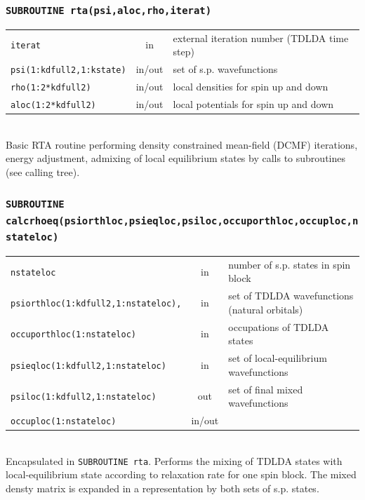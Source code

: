\documentclass[final,1p]{elsarticle}
\begin{document}
\subsubsection*{\tt SUBROUTINE rta(psi,aloc,rho,iterat)}
\begin{tabular}{lcl}
 {\tt iterat} & in & external iteration number (TDLDA time step)\\
 {\tt psi(1:kdfull2,1:kstate)} & in/out& set of s.p. wavefunctions\\
 {\tt rho(1:2*kdfull2)}& in/out & local densities for spin up and down\\
 {\tt aloc(1:2*kdfull2)} & in/out& local potentials for spin up and down\\
\end{tabular}
\\[4pt]
Basic RTA routine performing density constrained mean-field (DCMF)
iterations, energy adjustment, admixing of local equilibrium states by
calls to subroutines (see calling tree).



\subsubsection*{\tt SUBROUTINE calcrhoeq(psiorthloc,psieqloc,psiloc,occuporthloc,occuploc,nstateloc)}
\begin{tabular}{lcl}
 {\tt nstateloc} & in & number of s.p. states in spin block\\
 {\tt psiorthloc(1:kdfull2,1:nstateloc),} & in & set of TDLDA
 wavefunctions (natural orbitals)\\
 {\tt occuporthloc(1:nstateloc)} & in & occupations of TDLDA states\\
 {\tt psieqloc(1:kdfull2,1:nstateloc)} & in& set of local-equilibrium wavefunctions\\
 {\tt psiloc(1:kdfull2,1:nstateloc)} & out& set of final mixed wavefunctions\\
 {\tt occuploc(1:nstateloc)} & in/out & \\
\end{tabular}
\\[4pt]
Encapsulated in {\tt SUBROUTINE rta}. Performs the mixing of TDLDA
states with local-equilibrium state according to relaxation rate
for one spin block. The mixed densty matrix is expanded in a
representation by both sets of s.p. states. 
\end{document}
